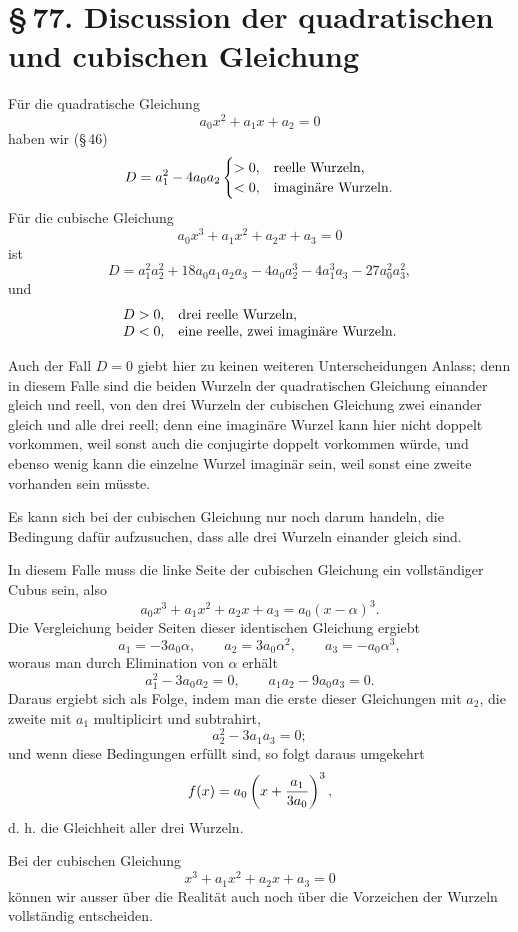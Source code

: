 \documentclass[11pt]{article}
\providecommand{\sect}[2]{\section*{\S\,#1. #2}}
\begin{document}
\sect{77}{Discussion der quadratischen und cubischen Gleichung}

F\"ur die quadratische Gleichung
\[
        a_0x^2+a_1x+a_2=0
\]
haben wir (\S\,46)
\[
        D=a_1^2-4a_0a_2
\begin{cases}
>0, & \text{reelle Wurzeln,}\cr
<0, & \text{imagin\"are Wurzeln.}
\end{cases}
\]
F\"ur die cubische Gleichung
\[
        a_0x^3+a_1x^2+a_2x+a_3=0
\]
ist
\[
 D=a_1^2a_2^2+18a_0a_1a_2a_3-4a_0a_2^3-4a_1^3a_3-27a_0^2a_3^2,
\]
und
\[
\begin{array}{ll}
D>0, & \text{drei reelle Wurzeln,}\cr
D<0, & \text{eine reelle, zwei imagin\"are Wurzeln.}
\end{array}
\]

Auch der Fall $D=0$ giebt hier zu keinen weiteren Unterscheidungen Anlass; denn in diesem Falle sind die beiden Wurzeln der quadratischen Gleichung einander gleich und reell, von den drei Wurzeln der cubischen Gleichung zwei einander gleich und alle drei reell; denn eine imagin\"are Wurzel kann hier nicht doppelt vorkommen, weil sonst auch die conjugirte doppelt vorkommen w\"urde, und ebenso wenig kann die einzelne Wurzel imagin\"ar sein, weil sonst eine zweite vorhanden sein m\"usste.

Es kann sich bei der cubischen Gleichung nur noch darum handeln, die Bedingung daf\"ur aufzusuchen, dass alle drei Wurzeln einander gleich sind.

In diesem Falle muss die linke Seite der cubischen Gleichung ein vollst\"andiger Cubus sein, also
\[
        a_0x^3+a_1x^2+a_2x+a_3=a_0(x-\alpha)^3.
\]
Die Vergleichung beider Seiten dieser identischen Gleichung ergiebt
\[
        a_1=-3a_0\alpha,\qquad a_2=3a_0\alpha^2,\qquad a_3=-a_0\alpha^3,
\]
woraus man durch Elimination von $\alpha$ erh\"alt
\begin{equation}
        a_1^2-3a_0a_2=0,\qquad a_1a_2-9a_0a_3=0.
\tag{1}
\end{equation}
Daraus ergiebt sich als Folge, indem man die erste dieser Gleichungen mit $a_2$, die zweite mit $a_1$ multiplicirt und subtrahirt,
\[
        a_2^2-3a_1a_3=0;
\]
und wenn diese Bedingungen erf\"ullt sind, so folgt daraus umgekehrt
\[
        f(x)=a_0\left(x+{a_1\over 3a_0}\right)^3,
\]
d. h. die Gleichheit aller drei Wurzeln.

Bei der cubischen Gleichung
\[
        x^3+a_1x^2+a_2x+a_3=0
\]
k\"onnen wir ausser \"uber die Realit\"at auch noch \"uber die Vorzeichen der Wurzeln vollst\"andig entscheiden.
\end{document}
